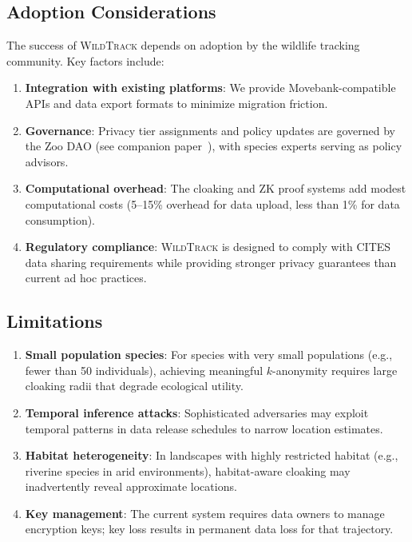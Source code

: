 \documentclass[11pt,letterpaper]{article}
\newcommand{\WildTrack}{\textsc{WildTrack}}
\begin{document}
\subsection{Adoption Considerations}

The success of \WildTrack{} depends on adoption by the wildlife tracking community. Key factors include:

\begin{enumerate}[leftmargin=*]
    \item \textbf{Integration with existing platforms}: We provide Movebank-compatible APIs and data export formats to minimize migration friction.
    \item \textbf{Governance}: Privacy tier assignments and policy updates are governed by the Zoo DAO (see companion paper~\cite{zoo2026dao}), with species experts serving as policy advisors.
    \item \textbf{Computational overhead}: The cloaking and ZK proof systems add modest computational costs (5--15\% overhead for data upload, less than 1\% for data consumption).
    \item \textbf{Regulatory compliance}: \WildTrack{} is designed to comply with CITES data sharing requirements while providing stronger privacy guarantees than current ad hoc practices.
\end{enumerate}

\subsection{Limitations}

\begin{enumerate}[leftmargin=*]
    \item \textbf{Small population species}: For species with very small populations (e.g., fewer than 50 individuals), achieving meaningful $k$-anonymity requires large cloaking radii that degrade ecological utility.
    \item \textbf{Temporal inference attacks}: Sophisticated adversaries may exploit temporal patterns in data release schedules to narrow location estimates.
    \item \textbf{Habitat heterogeneity}: In landscapes with highly restricted habitat (e.g., riverine species in arid environments), habitat-aware cloaking may inadvertently reveal approximate locations.
    \item \textbf{Key management}: The current system requires data owners to manage encryption keys; key loss results in permanent data loss for that trajectory.
\end{enumerate}
\end{document}
